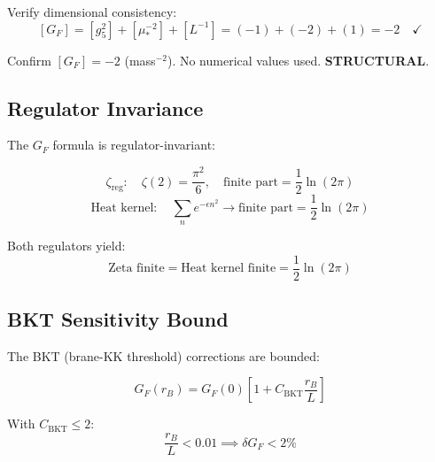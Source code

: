 \documentclass[11pt,a4paper]{article}
\begin{document}
Verify dimensional consistency:
\begin{equation}
\label{eq:gf-dim-check}
[G_F] = [g_5^2] + [\mu_*^{-2}] + [L^{-1}] = (-1) + (-2) + (1) = -2 \quad \checkmark
\end{equation}

\begin{trapbox}
\label{trap:rt07}
Confirm $[G_F] = -2$ (mass$^{-2}$). No numerical values used. \textbf{STRUCTURAL}.
\end{trapbox}

\subsection{Regulator Invariance}
\label{subsec:gf-regulator}

The $G_F$ formula is regulator-invariant:

\begin{equation}
\label{eq:zeta-finite-part}
\zeta_{\text{reg}}: \quad \zeta(2) = \frac{\pi^2}{6}, \quad \text{finite part} = \frac{1}{2}\ln(2\pi)
\end{equation}
\begin{equation}
\label{eq:heat-finite-part}
\text{Heat kernel}: \quad \sum_n e^{-\epsilon n^2} \to \text{finite part} = \frac{1}{2}\ln(2\pi)
\end{equation}

\begin{invariancebox}
\label{box:regulator-inv}
Both regulators yield:
\begin{equation}
\label{eq:regulator-match}
\text{Zeta finite} = \text{Heat kernel finite} = \frac{1}{2}\ln(2\pi)
\end{equation}
\end{invariancebox}

\subsection{BKT Sensitivity Bound}
\label{subsec:bkt-bound}

The BKT (brane-KK threshold) corrections are bounded:

\begin{equation}
\label{eq:bkt-gf}
G_F(r_B) = G_F(0)\left[1 + C_{\text{BKT}}\frac{r_B}{L}\right]
\end{equation}

With $C_{\text{BKT}} \leq 2$:
\begin{equation}
\label{eq:bkt-bound}
\frac{r_B}{L} < 0.01 \implies \delta G_F < 2\%
\end{equation}
\end{document}
